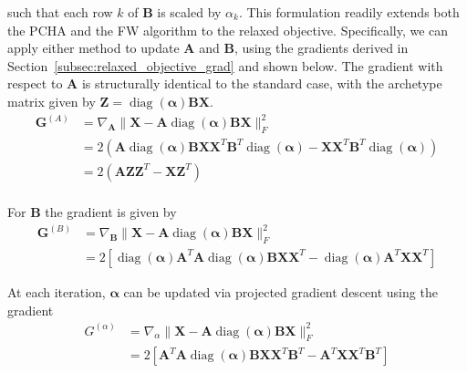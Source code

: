 \documentclass[oneside]{article}
\begin{document}
such that each row $k$ of $\mathbf{B}$ is scaled by $\alpha_k$. This formulation readily extends both the PCHA and the FW algorithm to the relaxed objective. Specifically, we can apply either method to update $\mathbf{A}$ and $\mathbf{B}$, using the gradients derived in Section~\ref{subsec:relaxed_objective_grad} and shown below. The gradient with respect to $\mathbf{A}$ is structurally identical to the standard case, with the archetype matrix given by $\mathbf{Z} = \operatorname{diag}(\boldsymbol{\alpha}) \mathbf{B} \mathbf{X}$.
\begin{equation}
    \label{eq:relaxed_objective_grad_A_}
    \begin{aligned}
        \mathbf{G}^{(A)} &= \nabla_{\mathbf{A}} \| {\mathbf{X}} - {\mathbf{A}} \operatorname{diag}(\boldsymbol{\alpha}) \mathbf{B} \mathbf{X} \|_F^2 \\
        &= 2 \left( \mathbf{A} \operatorname{diag}(\boldsymbol{\alpha}) \mathbf{B} \mathbf{X} \mathbf{X}^T \mathbf{B}^T \operatorname{diag}(\boldsymbol{\alpha}) - \mathbf{X} \mathbf{X}^T \mathbf{B}^T \operatorname{diag}(\boldsymbol{\alpha}) \right) \\
        &= 2 \left( \mathbf{A} \mathbf{Z} \mathbf{Z}^T - \mathbf{X}\mathbf{Z}^T \right) \\
    \end{aligned}
\end{equation}

For $\mathbf{B}$ the gradient is given by
\begin{equation}
    \label{eq:relaxed_objective_grad_B_}
    \begin{aligned}
        \mathbf{G}^{(B)} &= \nabla_{\mathbf{B}} \| {\mathbf{X}} - {\mathbf{A}} \operatorname{diag}(\boldsymbol{\alpha}) \mathbf{B} \mathbf{X}\|_F^2 \\
        &= 2
        \left[
            \operatorname{diag}(\boldsymbol{\alpha}) \mathbf{{A}}^T \mathbf{{A}} \operatorname{diag}(\boldsymbol{\alpha}) \mathbf{B} \mathbf{X} \mathbf{X}^T
            - \operatorname{diag}(\boldsymbol{\alpha}) \mathbf{{A}}^T \mathbf{{X}} \mathbf{X}^T
        \right]
    \end{aligned}
\end{equation}

At each iteration, $\boldsymbol{\alpha}$ can be updated via projected gradient descent using the gradient
\begin{equation}
    \label{eq:relaxed_objective_grad_alpha_}
    \begin{aligned}
        G^{(\alpha)} &= \nabla_{\alpha} \| {\mathbf{X}} - {\mathbf{A}} \operatorname{diag}(\boldsymbol{\alpha}) \mathbf{B} \mathbf{X}\|_F^2 \\
        & = 2
        \left[
            \mathbf{{A}}^T \mathbf{{A}} \operatorname{diag}(\boldsymbol{\alpha}) \mathbf{B} \mathbf{X} \mathbf{X}^T \mathbf{B}^T
            - \mathbf{{A}}^T \mathbf{{X}} \mathbf{X}^T \mathbf{B}^T
        \right]
    \end{aligned}
\end{equation}
\end{document}
